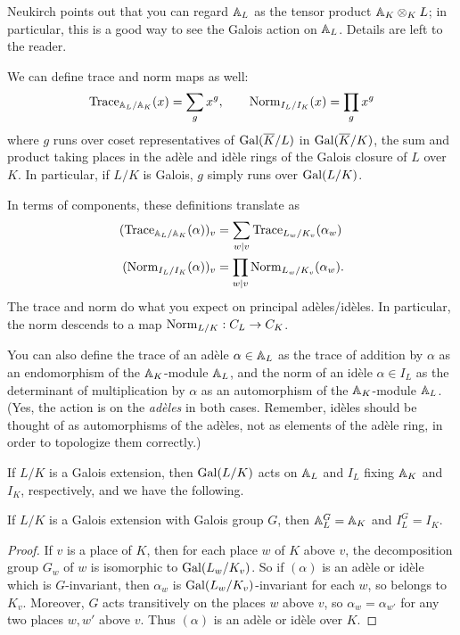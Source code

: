 Neukirch points out that you can regard $\AA_L$ as the tensor
product $\AA_K \otimes_K L$; in particular, this is a good way to see
the Galois action on $\AA_L$. Details are left to the reader.

\medskip
We can define trace and norm maps as well:
\[
\Trace_{\AA_L/\AA_K}(x) = \sum_g x^g, \qquad
\Norm_{I_L/I_K}(x) = \prod_g x^g
\]
where $g$ runs over coset representatives of $\Gal(\overline{K}/L)$
in $\Gal(\overline{K}/K)$, the sum and product taking places in the ad\`ele
and id\`ele rings of the Galois closure of $L$ over $K$.
In particular, if $L/K$ is Galois, $g$ simply runs over $\Gal(L/K)$.

In terms of components, these definitions translate as
\begin{align*}
  (\Trace_{\AA_L/\AA_K}(\alpha))_{v} &= \sum_{w | v}
\Trace_{L_w/K_v}(\alpha_w) \\
  (\Norm_{I_L/I_K}(\alpha))_{v} &= \prod_{w | v}
\Norm_{L_w/K_v}(\alpha_w).
\end{align*}
The trace and norm do what you expect on principal ad\`eles/id\`eles. In
particular, the norm descends to a map $\Norm_{L/K}: C_L \to C_K$.

You can also define the trace of an ad\`ele $\alpha \in \AA_L$ as the trace of
addition by $\alpha$ as an endomorphism of the $\AA_K$-module $\AA_L$,
and the norm of an id\`ele $\alpha \in I_L$ as the determinant of 
multiplication by $\alpha$ as an automorphism of the $\AA_K$-module
$\AA_L$. (Yes, the action is on the \emph{ad\`eles} in both cases.
Remember, id\`eles should be thought of as automorphisms of the ad\`eles,
not as elements of the ad\`ele ring, in order to topologize them correctly.)

If $L/K$ is a Galois extension, then $\Gal(L/K)$ acts on $\AA_L$ and
$I_L$ fixing $\AA_K$ and $I_K$, respectively, and we have the following.
\begin{prop}
If $L/K$ is a Galois extension with Galois group $G$, then
$\AA_L^G = \AA_K$ and $I_L^G = I_K$.
\end{prop}
\begin{proof}
If $v$ is a place of $K$, then for each place $w$ of $K$ above
$v$, the decomposition group $G_w$ of $w$ is isomorphic to
$\Gal(L_w/K_v)$. So if $(\alpha)$ is an ad\`ele or id\`ele which is
$G$-invariant, then $\alpha_w$ is $\Gal(L_w/K_v)$-invariant for each
$w$, so belongs to $K_v$. Moreover, $G$ acts transitively on the
places $w$ above $v$, so $\alpha_w = \alpha_{w'}$ for any two places
$w, w'$ above $v$. Thus $(\alpha)$ is an ad\`ele or id\`ele over $K$.
\end{proof}

